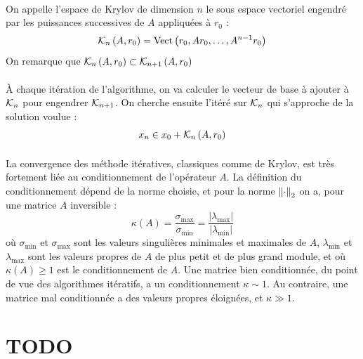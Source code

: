 		\paragraph{}
		On appelle l'espace de Krylov de dimension $n$ le sous espace vectoriel engendré par les puissances successives de $A$ appliquées à $r_0$ :
		\begin{equation}\label{eqn:krylov}
			\krylov[A, r_0]{n} = \operatorname{Vect}\left(r_0, Ar_0, \dots, A^{n-1}r_0\right)
		\end{equation}
		On remarque que $\krylov[A, r_0]{n}\subset\krylov[A, r_0]{n+1}$

		\paragraph{}
		À chaque itération de l'algorithme, on va calculer le vecteur de base à ajouter à $\krylov{n}$ pour engendrer $\krylov{n+1}$.
		On cherche ensuite l'itéré sur $\krylov{n}$ qui s'approche de la solution voulue :
		\begin{equation}\label{eqn:x_n}
			x_n \in x_0 + \krylov[A, r_0]{n}
		\end{equation}

	\paragraph{}
	La convergence des méthode itératives, classiques comme de Krylov, est très fortement liée au conditionnement de l'opérateur $A$.
	La définition du conditionnement dépend de la norme choisie, et pour la norme $\norm[2]{\cdot}$ on a, pour une matrice $A$ inversible :
	\begin{equation}\label{eqn:conditionnement}
		\kappa\left(A\right) = \frac{\sigma_{\max}}{\sigma_{\min}} = \frac{\left|\lambda_{\max}\right|}{\left|\lambda_{\min}\right|}
	\end{equation}
	où $\sigma_{\min}$ et $\sigma_{\max}$ sont les valeurs singulières minimales et maximales de $A$,
	$\lambda_{\min}$ et $\lambda_{\max}$ sont les valeurs propres de $A$ de plus petit et de plus grand module,
	et où $\kappa\left(A\right)\geq1$ est le conditionnement de $A$.
	Une matrice bien conditionnée, du point de vue des algorithmes itératifs, a un conditionnement $\kappa\sim1$.
	Au contraire, une matrice mal conditionnée a des valeurs propres éloignées, et $\kappa\gg1$.

\section{TODO}

